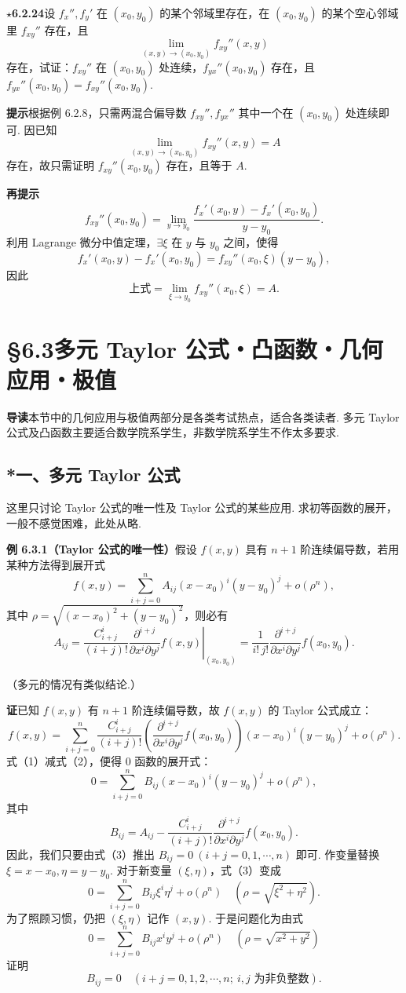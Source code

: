 \documentclass[UTF8, 12pt, fontset=fandol, oneside]{ctexart}
\begin{document}
\noindent\textbf{\ensuremath{\star}6.2.24}\quad 设 $f_x'',f_y'$ 在 $(x_0,y_0)$ 的某个邻域里存在，在 $(x_0,y_0)$ 的某个空心邻域里 $f_{xy}''$ 存在，且
\[
  \lim_{(x,y)\to(x_0,y_0)}f_{xy}''(x,y)
\]
存在，试证：$f_{xy}''$ 在 $(x_0,y_0)$ 处连续，$f_{yx}''(x_0,y_0)$ 存在，且 $f_{yx}''(x_0,y_0)=f_{xy}''(x_0,y_0)$.

\noindent\textbf{提示}\quad 根据例 6.2.8，只需两混合偏导数 $f_{xy}'',f_{yx}''$ 其中一个在 $(x_0,y_0)$ 处连续即可. 因已知
\[
  \lim_{(x,y)\to(x_0,y_0)}f_{xy}''(x,y)=A
\]
存在，故只需证明 $f_{xy}''(x_0,y_0)$ 存在，且等于 $A$.

\noindent\textbf{再提示}\quad
\[
  f_{xy}''(x_0,y_0)=\lim_{y\to y_0}
  \frac{f_x'(x_0,y)-f_x'(x_0,y_0)}{y-y_0}.
\]
利用 Lagrange 微分中值定理，$\exists\xi$ 在 $y$ 与 $y_0$ 之间，使得
\[
  f_x'(x_0,y)-f_x'(x_0,y_0)=f_{xy}''(x_0,\xi)(y-y_0),
\]
因此
\[
  \text{上式}=\lim_{\xi\to y_0}f_{xy}''(x_0,\xi)=A.
\]

\section*{§6.3\quad 多元 Taylor 公式・凸函数・几何应用・极值}

\noindent\textbf{导读}\quad 本节中的几何应用与极值两部分是各类考试热点，适合各类读者. 多元 Taylor 公式及凸函数主要适合数学院系学生，非数学院系学生不作太多要求.

\subsection*{*一、多元 Taylor 公式}

这里只讨论 Taylor 公式的唯一性及 Taylor 公式的某些应用. 求初等函数的展开，一般不感觉困难，此处从略.

\noindent\textbf{例 6.3.1（Taylor 公式的唯一性）}\quad 假设 $f(x,y)$ 具有 $n+1$ 阶连续偏导数，若用某种方法得到展开式
\[
  f(x,y)=\sum_{i+j=0}^{n}A_{ij}(x-x_0)^i(y-y_0)^j+o(\rho^n), \tag{1}
\]
其中 $\rho=\sqrt{(x-x_0)^2+(y-y_0)^2}$，则必有
\[
  A_{ij}=\frac{C_{i+j}^i}{(i+j)!}
  \left.
  \frac{\partial^{i+j}}{\partial x^i\partial y^j}f(x,y)
  \right|_{(x_0,y_0)}
  =\frac1{i!\,j!}
  \frac{\partial^{i+j}}{\partial x^i\partial y^j}f(x_0,y_0).
\]

（多元的情况有类似结论.）

\noindent\textbf{证}\quad 已知 $f(x,y)$ 有 $n+1$ 阶连续偏导数，故 $f(x,y)$ 的 Taylor 公式成立：
\[
  f(x,y)=\sum_{i+j=0}^{n}
  \frac{C_{i+j}^i}{(i+j)!}
  \left(\frac{\partial^{i+j}}{\partial x^i\partial y^j}f(x_0,y_0)\right)
  (x-x_0)^i(y-y_0)^j+o(\rho^n). \tag{2}
\]
式（1）减式（2），便得 0 函数的展开式：
\[
  0=\sum_{i+j=0}^{n}B_{ij}(x-x_0)^i(y-y_0)^j+o(\rho^n), \tag{3}
\]
其中
\[
  B_{ij}=A_{ij}-\frac{C_{i+j}^i}{(i+j)!}
  \frac{\partial^{i+j}}{\partial x^i\partial y^j}f(x_0,y_0).
\]
因此，我们只要由式（3）推出 $B_{ij}=0\ (i+j=0,1,\cdots,n)$ 即可. 作变量替换 $\xi=x-x_0,\eta=y-y_0$. 对于新变量 $(\xi,\eta)$，式（3）变成
\[
  0=\sum_{i+j=0}^{n}B_{ij}\xi^i\eta^j+o(\rho^n)
  \quad(\rho=\sqrt{\xi^2+\eta^2}).
\]
为了照顾习惯，仍把 $(\xi,\eta)$ 记作 $(x,y)$. 于是问题化为由式
\[
  0=\sum_{i+j=0}^{n}B_{ij}x^iy^j+o(\rho^n)
  \quad(\rho=\sqrt{x^2+y^2}) \tag{4}
\]
证明
\[
  B_{ij}=0\quad(i+j=0,1,2,\cdots,n;\ i,j\text{ 为非负整数}).
\]
\end{document}
